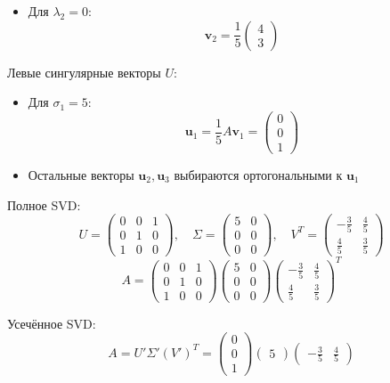 \documentclass[a4paper]{article}
\begin{document}
\begin{enumerate}
\begin{enumerate}
\begin{itemize}
    \item
    Для \( \lambda_2 = 0 \):  
    \[
    \mathbf{v}_2 = \frac{1}{5} \begin{pmatrix} 4 \\ 3 \end{pmatrix}
    \]
  \end{itemize}
  Левые сингулярные векторы \( U \):  
  \begin{itemize}
    \item 
    Для \( \sigma_1 = 5 \):  
    \[
    \mathbf{u}_1 = \frac{1}{5} A \mathbf{v}_1 =
     \begin{pmatrix} 0 \\ 0 \\ 1 \end{pmatrix}
    \]  
    \item
    Остальные векторы \( \mathbf{u}_2, \mathbf{u}_3 \)
     выбираются ортогональными к \( \mathbf{u}_1 \)
  \end{itemize}
  Полное SVD:  
  \[
  U = \begin{pmatrix}
  0 & 0 & 1 \\
  0 & 1 & 0 \\
  1 & 0 & 0
  \end{pmatrix}, \quad \Sigma = \begin{pmatrix}
  5 & 0 \\
  0 & 0 \\
  0 & 0
  \end{pmatrix}, \quad V^T = \begin{pmatrix}
  -\frac{3}{5} & \frac{4}{5} \\
  \frac{4}{5} & \frac{3}{5}
  \end{pmatrix}
  \]
  \[
  A = \begin{pmatrix}
  0 & 0 & 1 \\
  0 & 1 & 0 \\
  1 & 0 & 0
  \end{pmatrix} \begin{pmatrix}
  5 & 0 \\
  0 & 0 \\
  0 & 0
  \end{pmatrix} \begin{pmatrix}
  -\frac{3}{5} & \frac{4}{5} \\
  \frac{4}{5} & \frac{3}{5}
  \end{pmatrix}^T
  \]
  
  Усечённое SVD:
  \[
  A = U' \Sigma' (V')^T = \begin{pmatrix} 0 \\ 0 \\ 1 \end{pmatrix} 
  \begin{pmatrix} 5 \end{pmatrix} \begin{pmatrix} -\frac{3}{5} & 
    \frac{4}{5} \end{pmatrix}
  \]
  \end{enumerate}


\end{enumerate}
\end{document}
